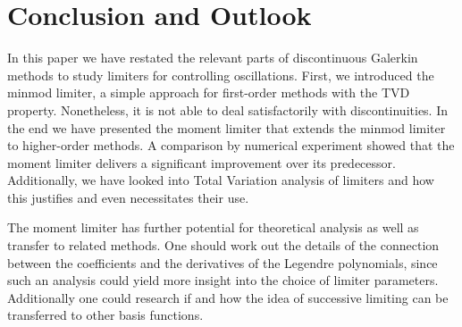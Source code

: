 \section{Conclusion and Outlook}
\label{sec:conclusion}

In this paper we have restated the relevant parts of discontinuous Galerkin methods to study limiters for controlling oscillations.
First, we introduced the minmod limiter, a simple approach for first-order methods with the TVD property.
Nonetheless, it is not able to deal satisfactorily with discontinuities.
In the end we have presented the moment limiter that extends the minmod limiter to higher-order methods.
A comparison by numerical experiment showed that the moment limiter delivers a significant improvement over its predecessor.
Additionally, we have looked into Total Variation analysis of limiters and how this justifies and even necessitates their use.

The moment limiter has further potential for theoretical analysis as well as transfer to related methods.
One should work out the details of the connection between the coefficients and the derivatives of the Legendre polynomials, since such an analysis could yield more insight into the choice of limiter parameters.
Additionally one could research if and how the idea of successive limiting can be transferred to other basis functions.
